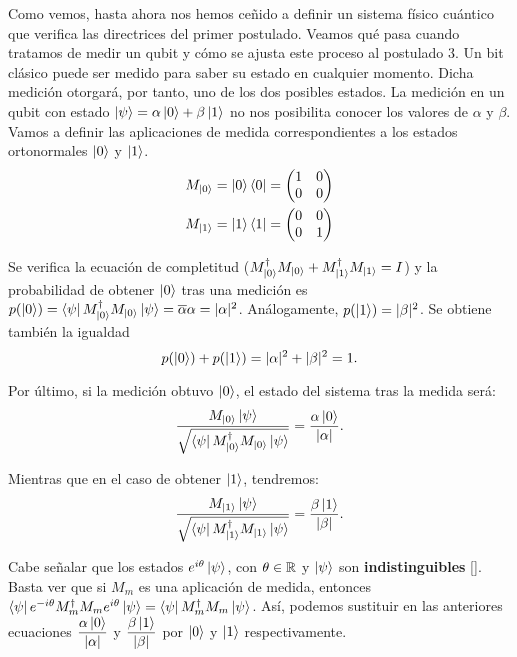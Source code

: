 Como vemos, hasta ahora nos hemos ceñido a definir un sistema físico cuántico que verifica las directrices del primer postulado. Veamos qué pasa cuando tratamos de medir un qubit y cómo se ajusta este proceso al postulado 3. Un bit clásico puede ser medido para saber su estado en cualquier momento. Dicha medición otorgará, por tanto, uno de los dos posibles estados. La medición en un qubit con estado $\left|\psi\right\rangle=\alpha\left|0\right\rangle+\beta\left|1\right\rangle$ no nos posibilita conocer los valores de $\alpha$ y $\beta$. Vamos a definir las aplicaciones de medida correspondientes a los estados ortonormales $\left|0\right\rangle$ y $\left|1\right\rangle$.
\[
\begin{split}
M_{\left|0\right\rangle}=\left|0\right\rangle\left\langle0\right|=\left(\begin{matrix}1&0\\0&0\end{matrix}\right)\\
M_{\left|1\right\rangle}=\left|1\right\rangle\left\langle1\right|=\left(\begin{matrix}0&0\\0&1\end{matrix}\right)
\end{split}
\]

Se verifica la ecuación de completitud ($M_{\left|0\right\rangle}^\dag M_{\left|0\right\rangle} + M_{\left|1\right\rangle}^\dag M_{\left|1\right\rangle}=I$) y la probabilidad de obtener $\left|0\right\rangle$ tras una medición es $p(\left|0\right\rangle)=\left\langle\psi\right|M_{\left|0\right\rangle}^\dag M_{\left|0\right\rangle}\left|\psi\right\rangle=\overline{\alpha}\alpha = |\alpha|^2$. Análogamente, $p(\left|1\right\rangle)=|\beta|^2$. Se obtiene también la igualdad
\[p(\left|0\right\rangle)+p(\left|1\right\rangle)=|\alpha|^2+|\beta|^2=1.\]

Por último, si la medición obtuvo $\left|0\right\rangle$, el estado del sistema tras la medida será:
\begin{equation}
\dfrac{M_{\left|0\right\rangle}\left|\psi\right\rangle}{\sqrt{\left\langle\psi\right|M_{\left|0\right\rangle}^\dag M_{\left|0\right\rangle}\left|\psi\right\rangle}}=\dfrac{\alpha\left|0\right\rangle}{|\alpha|}.
\end{equation}

Mientras que en el caso de obtener $\left|1\right\rangle$, tendremos:
\begin{equation}
\dfrac{M_{\left|1\right\rangle}\left|\psi\right\rangle}{\sqrt{\left\langle\psi\right|M_{\left|1\right\rangle}^\dag M_{\left|1\right\rangle}\left|\psi\right\rangle}}=\dfrac{\beta\left|1\right\rangle}{|\beta|}.
\end{equation}

Cabe señalar que los estados $e^{i\theta}\left|\psi\right\rangle$, con $\theta\in\mathbb{R}$ y $\left|\psi\right\rangle$ son \textbf{indistinguibles} [\cite[p.~93]{nielsen2001quantum}]. Basta ver que si $M_m$ es una aplicación de medida, entonces $\left\langle\psi\right|e^{-i\theta}M_m^\dag M_m e^{i\theta}\left|\psi\right\rangle=\left\langle\psi\right|M_m^\dag M_m\left|\psi\right\rangle$. Así, podemos sustituir en las anteriores ecuaciones $\dfrac{\alpha\left|0\right\rangle}{|\alpha|}$ y $\dfrac{\beta\left|1\right\rangle}{|\beta|}$ por $\left|0\right\rangle$ y $\left|1\right\rangle$ respectivamente.


